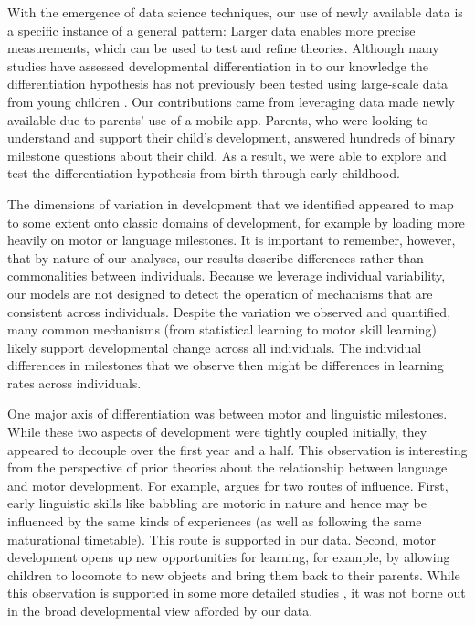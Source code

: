 \documentclass[man, floatsintext]{apa7}
\begin{document}
With the emergence of data science techniques, our use of newly
available data is a specific instance of a general pattern: Larger data
enables more precise measurements, which can be used to test and refine theories.
Although many studies have assessed developmental differentiation in
to our knowledge the differentiation hypothesis has not previously been tested using large-scale
data from young children \cite{breit2021}.
Our contributions came from leveraging data made newly available
due to parents' use of a mobile app. Parents, who were looking to understand and
support their child's development, answered hundreds of binary milestone
questions about their child. As a result, we were able to explore and
test the differentiation hypothesis from birth through early childhood.

The dimensions of variation in development that we identified appeared to map to some extent onto classic domains of development, for example by loading more heavily on motor or language milestones.
It is important to remember, however, that by nature of our analyses, our results describe differences rather than commonalities between individuals. Because we leverage individual variability, our models are not designed to detect the operation of mechanisms that are consistent across individuals. Despite the variation we observed and quantified, many common mechanisms (from statistical learning to motor skill learning) likely support developmental change across all individuals. The individual differences in milestones that we observe then might be differences in learning rates across individuals.

One major axis of differentiation was between motor and linguistic milestones. While these two aspects of development were tightly coupled initially, they appeared to decouple over the first year and a half. This observation is interesting from the perspective of prior theories about the relationship between language and motor development. For example, \cite{iverson2010} argues for two routes of influence. First, early linguistic skills like babbling are motoric in nature and hence may be influenced by the same kinds of experiences (as well as following the same maturational timetable). This route is supported in our data. Second, motor development opens up new opportunities for learning, for example, by allowing children to locomote to new objects and bring them back to their parents. While this observation is supported in some more detailed studies \parencite[e.g.,][]{walle2014,karasik2014}, it was not borne out in the broad developmental view afforded by our data.
\end{document}
